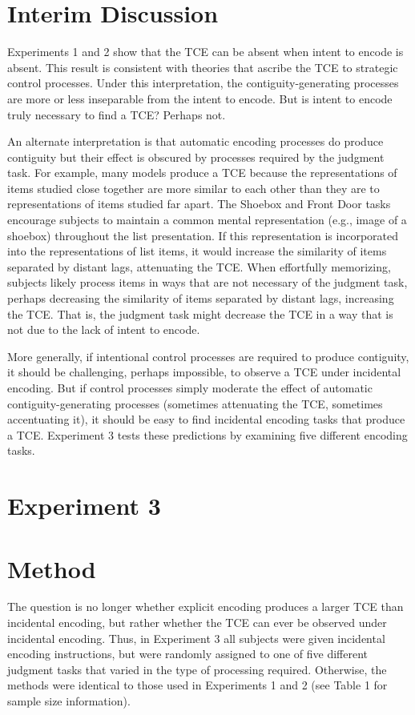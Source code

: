 \documentclass[jou,natbib,floatsintext]{apa6} %
\begin{document}
\color{black}







\section{Interim Discussion}
Experiments 1 and 2 show that the TCE can be absent when intent to encode is absent. This result is consistent with theories that ascribe the TCE to strategic control processes. Under this interpretation, the contiguity-generating processes are more or less inseparable from the intent to encode. But is intent to encode truly necessary to find a TCE? Perhaps not.

An alternate interpretation is that automatic encoding processes do produce contiguity but their effect is obscured by processes required by the judgment task. For example, many models produce a TCE because the representations of items studied close together are more similar to each other than they are to representations of items studied far apart. The Shoebox and Front Door tasks encourage subjects to maintain a common mental representation (e.g., image of a shoebox) throughout the list presentation. If this representation is incorporated into the representations of list items, it would increase the similarity of items separated by distant lags, attenuating the TCE. When effortfully memorizing, subjects likely process items in ways that are not necessary of the judgment task, perhaps decreasing the similarity of items separated by distant lags, increasing the TCE. That is, the judgment task might decrease the TCE in a way that is not due to the lack of intent to encode.

More generally, if intentional control processes are required to produce contiguity, it should be challenging, perhaps impossible, to observe a TCE under incidental encoding. But if control processes simply moderate the effect of automatic contiguity-generating processes (sometimes attenuating the TCE, sometimes accentuating it), it should be easy to find incidental encoding tasks that produce a TCE. Experiment 3 tests these predictions by examining five different encoding tasks.

\section{Experiment 3}
\section{Method}
The question is no longer whether explicit encoding produces a larger TCE than incidental encoding, but rather whether the TCE can ever be observed under incidental encoding. Thus, in Experiment 3 all subjects were given incidental encoding instructions, but were randomly assigned to one of five different judgment tasks that varied in the type of processing required. Otherwise, the methods were identical to those used in Experiments 1 and 2 (see Table 1 for sample size information).
\end{document}

